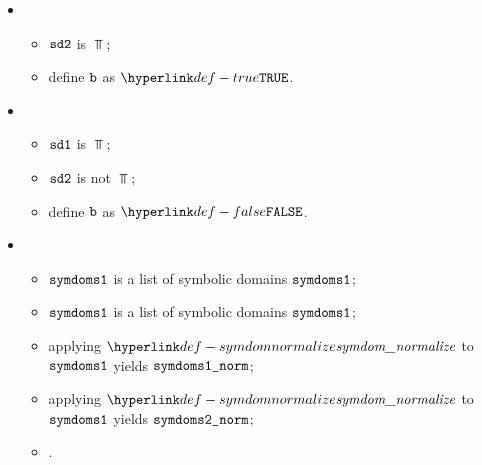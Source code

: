 \ProseParagraph
\OneApplies
\begin{itemize}
  \item {}
  \begin{itemize}
    \item $\sdtwo$ is $\Top$;
    \item define $\vb$ as $\True$.
  \end{itemize}

  \item {}
  \begin{itemize}
    \item $\sdone$ is $\Top$;
    \item $\sdtwo$ is not $\Top$;
    \item define $\vb$ as $\False$.
  \end{itemize}

  \item \AllApply
  \begin{itemize}
    \item $\symdomsone$ is a list of symbolic domains $\symdomsone$;
    \item $\symdomstwo$ is a list of symbolic domains $\symdomstwo$;
    \item applying $\symdomnormalize$ to $\symdomsone$ yields $\symdomsonenorm$;
    \item applying $\symdomnormalize$ to $\symdomstwo$ yields $\symdomstwonorm$;
    \item {}.
  \end{itemize}
\end{itemize}

\FormallyParagraph
\begin{mathpar}
\end{mathpar}

\begin{mathpar}
\end{mathpar}

